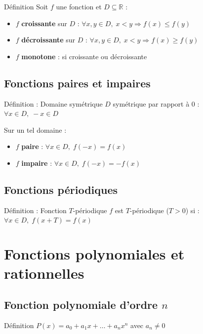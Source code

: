 \documentclass[a4paper,11pt]{article}
\begin{document}
\begin{defbox}{Définition}
Soit $f$ une fonction et $D \subseteq \mathbb{R}$ :
\begin{itemize}
    \item $f$ \textbf{croissante} sur $D$ : $\forall x, y \in D, \; x < y \Rightarrow f(x) \leq f(y)$
    \item $f$ \textbf{décroissante} sur $D$ : $\forall x, y \in D, \; x < y \Rightarrow f(x) \geq f(y)$
    \item $f$ \textbf{monotone} : si croissante ou décroissante
\end{itemize}
\end{defbox}

\subsection{Fonctions paires et impaires}

\begin{defbox}{Définition : Domaine symétrique}
$D$ symétrique par rapport à 0 : $\forall x \in D, \; -x \in D$

Sur un tel domaine :
\begin{itemize}
    \item $f$ \textbf{paire} : $\forall x \in D, \; f(-x) = f(x)$
    \item $f$ \textbf{impaire} : $\forall x \in D, \; f(-x) = -f(x)$
\end{itemize}
\end{defbox}

\subsection{Fonctions périodiques}

\begin{defbox}{Définition : Fonction $T$-périodique}
$f$ est $T$-périodique ($T > 0$) si : $\forall x \in D, \; f(x + T) = f(x)$
\end{defbox}

\newpage
\section{Fonctions polynomiales et rationnelles}

\subsection{Fonction polynomiale d'ordre $n$}

\begin{defbox}{Définition}
$P(x) = a_0 + a_1x + \ldots + a_nx^n$ avec $a_n \neq 0$
\end{defbox}
\end{document}
